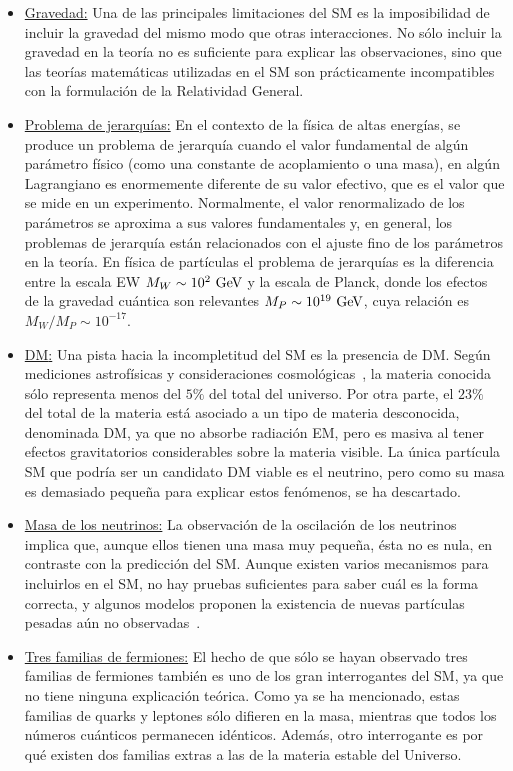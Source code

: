 \begin{itemize}
    \item \underline{Gravedad:} Una de las principales limitaciones del \ac{SM} es la imposibilidad de incluir la gravedad del mismo modo que otras interacciones. No sólo incluir la gravedad en la teoría no es suficiente para explicar las observaciones, sino que las teor\'ias matemáticas utilizadas en el \ac{SM} son prácticamente incompatibles con la formulación de la Relatividad General.
    \item \underline{Problema de jerarqu\'ias:} En el contexto de la física de altas energías, se produce un problema de jerarquía cuando el valor fundamental de algún parámetro físico (como una constante de acoplamiento o una masa), en algún Lagrangiano es enormemente diferente de su valor efectivo, que es el valor que se mide en un experimento. Normalmente, el valor renormalizado de los parámetros se aproxima a sus valores fundamentales y, en general, los problemas de jerarquía están relacionados con el ajuste fino de los parámetros en la teoría. En física de partículas el problema de jerarqu\'ias es la diferencia entre la escala \ac{EW} \(M_W \sim 10^2~\text{GeV}\) y la escala de Planck, donde los efectos de la gravedad cuántica son relevantes \(M_P\sim10^{19}~\text{GeV}\), cuya relación es \(M_W / M_P \sim 10^{-17}\).
    \item \underline{\acf{DM}:} Una pista hacia la incompletitud del \ac{SM} es la presencia de \ac{DM}. Según mediciones astrofísicas y consideraciones cosmológicas~\cite{Zwicky-1937,Rubin_Kent-1970,Planck-2014,Clowe-2006,Brada-2008}, la materia conocida sólo representa menos del \(5\%\) del total del universo. Por otra parte, el \(23\%\) del total de la materia está asociado a un tipo de materia desconocida, denominada \ac{DM}, ya que no absorbe radiación \ac{EM}, pero es masiva al tener efectos gravitatorios considerables sobre la materia visible. La única partícula \ac{SM} que podría ser un candidato \ac{DM} viable es el neutrino, pero como su masa es demasiado pequeña para explicar estos fenómenos, se ha descartado.
    \item \underline{Masa de los neutrinos:} La observación de la oscilación de los neutrinos implica que, aunque ellos tienen una masa muy pequeña, ésta no es nula, en contraste con la predicción del \ac{SM}. Aunque existen varios mecanismos para incluirlos en el \ac{SM}, no hay pruebas suficientes para saber cuál es la forma correcta, y algunos modelos proponen la existencia de nuevas partículas pesadas aún no observadas~\cite{GellMann_Ramond_Slansky-2010,Glashow-1980,Ramond-2005}.
    \item \underline{Tres familias de fermiones:} El hecho de que s\'olo se hayan observado tres familias de fermiones tambi\'en es uno de los gran interrogantes del \ac{SM}, ya que no tiene ninguna explicaci\'on te\'orica. Como ya se ha mencionado, estas familias de quarks y leptones s\'olo difieren en la masa, mientras que todos los n\'umeros cu\'anticos permanecen id\'enticos. Adem\'as, otro interrogante es por qu\'e existen dos familias extras a las de la materia estable del Universo.
\end{itemize}





